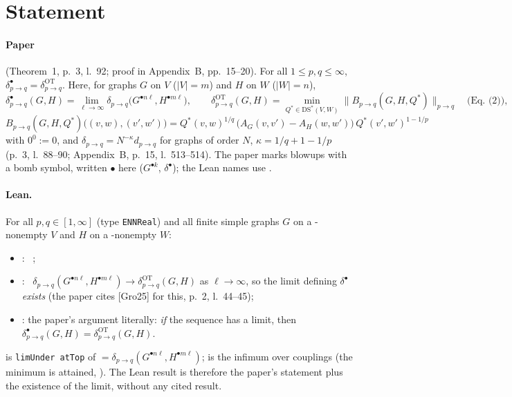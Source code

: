 

\paperversion

\section{Statement}

\paragraph{Paper} (Theorem~1, p.~3, l.~92; proof in Appendix~B, pp.~15--20). For all $1\le p,q\le\infty$,
$\delta^{\bullet}_{p\to q}=\delta^{\mathrm{OT}}_{p\to q}$. Here, for graphs $G$ on $V$ ($|V|=m$) and $H$ on $W$ ($|W|=n$),
\[
  \delta^{\bullet}_{p\to q}(G,H)=\lim_{\ell\to\infty}\delta_{p\to q}\bigl(G^{\bullet n\ell},H^{\bullet m\ell}\bigr),
  \qquad
  \delta^{\mathrm{OT}}_{p\to q}(G,H)=\min_{Q^*\in\mathrm{DS}^*(V,W)}\bigl\|B_{p\to q}(G,H,Q^*)\bigr\|_{p\to q}\quad\text{(Eq.~(2))},
\]
$B_{p\to q}(G,H,Q^*)\bigl((v,w),(v',w')\bigr)=Q^*(v,w)^{1/q}\,\bigl(A_G(v,v')-A_H(w,w')\bigr)\,Q^*(v',w')^{1-1/p}$ with $0^0:=0$,
and $\delta_{p\to q}=N^{-\kappa}d_{p\to q}$ for graphs of order $N$, $\kappa=1/q+1-1/p$ (p.~3, l.~88--90; Appendix~B,
p.~15, l.~513--514). The paper marks blowups with a bomb symbol, written $\bullet$ here ($G^{\bullet k}$,
$\delta^\bullet$); the Lean names use .

\paragraph{Lean.} For all $p,q\in[1,\infty]$ (type \texttt{ENNReal}) and all finite simple graphs $G$ on a
\hyp{nonempty} $V$ and $H$ on a \hyp{nonempty} $W$:
\begin{itemize}
\item {}: \ ;
\item {}: \ $\delta_{p\to q}(G^{\bullet n\ell},H^{\bullet m\ell})\to\delta^{\mathrm{OT}}_{p\to q}(G,H)$ as $\ell\to\infty$,
  so the limit defining $\delta^\bullet$ \emph{exists} (the paper cites [Gro25] for this, p.~2, l.~44--45);
\item {}: the paper's argument literally: \emph{if} the sequence has a limit, then
  $\delta^\bullet_{p\to q}(G,H)=\delta^{\mathrm{OT}}_{p\to q}(G,H)$.
\end{itemize}
 is \texttt{limUnder atTop} of  $=\delta_{p\to q}(G^{\bullet n\ell},H^{\bullet m\ell})$;
 is the infimum over couplings (the minimum is attained, ). The Lean result is
therefore the paper's statement plus the existence of the limit, without any cited result.

